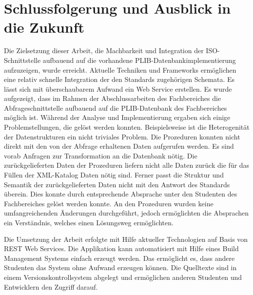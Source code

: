 \chapter*{Schlussfolgerung und Ausblick in die Zukunft}


Die Zielsetzung dieser Arbeit, die Machbarkeit und Integration der ISO-Schnittstelle aufbauend auf die vorhandene PLIB-Datenbankimplementierung aufzuzeigen, wurde erreicht. Aktuelle Techniken und Frameworks ermöglichen eine relativ schnelle Integration der den Standards zugehörigen Schemata. Es lässt sich mit überschaubarem Aufwand ein Web Service erstellen. 
Es wurde aufgezeigt, dass im Rahmen der Abschlussarbeiten des Fachbereiches die Abfrageschnittstelle aufbauend auf die PLIB-Datenbank des Fachbereiches möglich ist. Während der Analyse und Implementierung ergaben sich einige Problemstellungen, die gelöst werden konnten. Beispielsweise ist die Heterogenität der Datenstrukturen ein nicht triviales Problem. Die Prozeduren konnten nicht direkt mit den von der Abfrage erhaltenen Daten aufgerufen werden. Es sind vorab Anfragen zur Transformation an die Datenbank nötig. 
Die zurückgelieferten Daten der Prozeduren liefern nicht alle Daten zurück die für das Füllen der XML-Katalog Daten nötig sind. Ferner passt die Struktur und Semantik der zurückgelieferten Daten nicht mit den Antwort des Standards überein. 
Dies konnte durch entsprechende Absprache unter den Studenten des Fachbereiches gelöst werden konnte. An den Prozeduren wurden keine umfangreichenden Änderungen durchgeführt, jedoch ermöglichten die Absprachen ein Verständnis, welches einen Lösungsweg ermöglichten. 

Die Umsetzung der Arbeit erfolgte mit Hilfe aktueller Technologien auf Basis von REST Web Services. Die Applikation kann automatisiert mit Hilfe eines Build Management Systems einfach erzeugt werden. Das ermöglicht es, dass andere Studenten das System ohne Aufwand erzeugen können. Die Quelltexte sind in einem Versionskontrollsystem abgelegt und ermöglichen anderen Studenten und Entwicklern den Zugriff darauf. 

